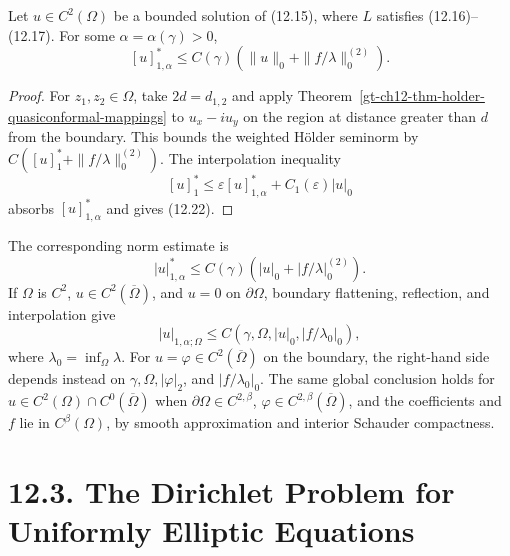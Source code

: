 \begin{theorem}
\label{gt-ch12-thm-interior-holder-gradient-linear}
Let $u\in C^2(\Omega)$ be a bounded solution of (12.15), where
$L$ satisfies (12.16)--(12.17).  For some
$\alpha=\alpha(\gamma)>0$,
\begin{equation}\tag{12.22}
[u]^*_{1,\alpha}
\le C(\gamma)
\left(\|u\|_0+\|f/\lambda\|_0^{(2)}\right).
\end{equation}
\end{theorem}
\begin{proof}
\sketch For $z_1,z_2\in\Omega$, take
$2d=d_{1,2}$ and apply
Theorem~\ref{gt-ch12-thm-holder-quasiconformal-mappings} to
$u_x-iu_y$ on the region at distance greater than $d$ from the boundary.
This bounds the weighted H\"older seminorm by
$C([u]^*_1+\|f/\lambda\|_0^{(2)})$.  The interpolation inequality
\begin{equation}\tag{12.23}
[u]^*_1\le\varepsilon[u]^*_{1,\alpha}+C_1(\varepsilon)|u|_0
\end{equation}
absorbs $[u]^*_{1,\alpha}$ and gives (12.22).
\end{proof}

The corresponding norm estimate is
\begin{equation}\tag{12.24}
|u|^*_{1,\alpha}
\le C(\gamma)\left(|u|_0+|f/\lambda|_0^{(2)}\right).
\end{equation}
If $\Omega$ is $C^2$, $u\in C^2(\overline\Omega)$, and $u=0$ on
$\partial\Omega$, boundary flattening, reflection, and interpolation give
\[
|u|_{1,\alpha;\Omega}
\le C(\gamma,\Omega,|u|_0,|f/\lambda_0|_0),
\]
where $\lambda_0=\inf_\Omega\lambda$.  For
$u=\varphi\in C^2(\overline\Omega)$ on the boundary, the right-hand side
depends instead on $\gamma,\Omega,|\varphi|_2$, and $|f/\lambda_0|_0$.
The same global conclusion holds for
$u\in C^2(\Omega)\cap C^0(\overline\Omega)$ when
$\partial\Omega\in C^{2,\beta}$, $\varphi\in C^{2,\beta}(\overline\Omega)$,
and the coefficients and $f$ lie in $C^\beta(\Omega)$, by smooth
approximation and interior Schauder compactness.

\section*{12.3. The Dirichlet Problem for Uniformly Elliptic Equations}

